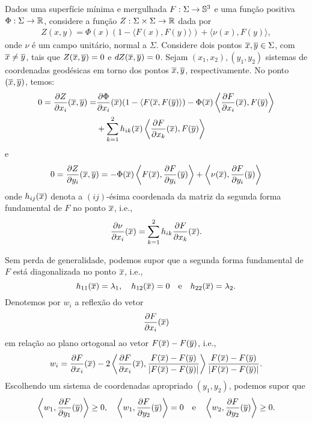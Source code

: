 Dados uma superfície mínima e mergulhada $F:\Sigma\to\mathbb{S}^3$ 
e uma função positiva $\Phi: \Sigma\to\mathbb{R}$, considere a função 
$Z:\Sigma\times\Sigma\to\mathbb{R}$ dada por
\begin{eqnarray}\label{eq:funcaoZ}
Z(x,y) = \Phi(x) (1 - \langle F(x), F(y) \rangle) + \langle \nu(x), F(y) \rangle,
\end{eqnarray}
onde $\nu$ \'e um campo unitário, normal a $\Sigma$. Considere dois 
pontos $\overline{x}, \overline{y} \in \Sigma$, com $\overline{x} \neq \overline{y}$, tais que $Z(\overline{x}, \overline{y}) = 0$ e $dZ(\overline{x}, \overline{y}) = 0$. Sejam $(x_1,x_2), (y_1,y_2)$ sistemas de coordenadas geodésicas em torno dos pontos $\overline{x}, \overline{y}$, respectivamente. No ponto $(\overline{x},\overline{y})$, temos:
\begin{eqnarray}\label{diff_Z_x}
\begin{aligned}
0 = \frac{\partial Z}{\partial x_i} (\overline{x}, \overline{y}) = &
\frac{\partial \Phi}{\partial x_i}(\overline{x}) (1 - \langle F(\overline{x}, F(\overline{y}) \rangle) -  
\Phi(\overline{x}) \left\langle \frac{\partial F}{\partial x_i}(\overline{x}), F(\overline{y}) \right\rangle \\ & + \sum_{k=1}^{2} h_{ik}(\overline{x}) \left\langle \frac{\partial F}{\partial x_k}(\overline{x}), F(\overline{y}) \right\rangle
\end{aligned}
\end{eqnarray}
e
\begin{equation}\label{diff_Z_y}
0 = \frac{\partial Z}{\partial y_i} (\overline{x}, \overline{y}) = - \Phi(\overline{x}) \left\langle F(\overline{x}), \frac{\partial F}{\partial y_i} (\overline{y}) \right\rangle + \left\langle \nu(\overline{x}), \frac{\partial F}{\partial y_i}(\overline{y}) \right\rangle
\end{equation}
onde $h_{ij}(\overline{x})$ denota a $(ij)$-ésima coordenada da matriz da segunda forma fundamental de $F$ no ponto $\overline{x}$, i.e.,
\begin{eqnarray}\label{eq:partialNu}
\frac{\partial\nu}{\partial x_i}(\overline{x}) = 
\sum_{k=1}^2h_{ik}\frac{\partial F}{\partial x_k}(\overline{x}).
\end{eqnarray}

\vspace{.2cm}

Sem perda de generalidade, podemos supor que a segunda forma
fundamental de $F$ est\'a diagonalizada no ponto $\overline{x}$, i.e.,
\[
h_{11}(\overline{x})=\lambda_1, \quad h_{12}(\overline{x}) = 0 \quad\mbox{e}\quad
h_{22}(\overline{x}) = \lambda_2.
\]
Denotemos por $w_i$ a reflex\~ao do vetor
\[
\frac{\partial F}{\partial x_i}(\overline{x})
\]
em rela\c c\~ao ao plano ortogonal ao vetor $F(\overline{x}) - F(\overline{y})$, i.e.,
\begin{eqnarray}\label{eq:reflexao}
w_i = \frac{\partial F}{\partial x_i}(\overline{x}) - 
2 \left\langle \frac{\partial F}{\partial x_i}(\overline{x}), \frac{F(\overline{x}) - 
F(\overline{y})}{|F(\overline{x}) - F(\overline{y})|} \right\rangle \frac{F(\overline{x}) - 
F(\overline{y})}{|F(\overline{x}) - F(\overline{y})|}.
\end{eqnarray}
Escolhendo um sistema de coordenadas apropriado $(y_1,y_2)$,
podemos supor que
\begin{equation*}
\left\langle w_1, \frac{\partial F}{\partial y_1}(\overline{y}) \right\rangle \geq 0, 
\quad 
\left\langle w_1, \frac{\partial F}{\partial y_2}(\overline{y}) \right\rangle = 0 
\quad \text{e} \quad 
\left\langle w_2, \frac{\partial F}{\partial y_2}(\overline{y}) \right\rangle \geq 0.
\end{equation*}

